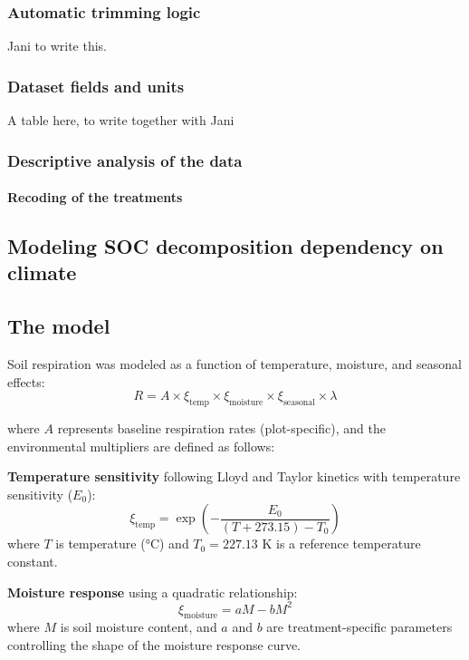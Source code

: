 \documentclass[12pt,a4paper]{article}
\begin{document}
\subsubsection{Automatic trimming logic}
Jani to write this.

\subsubsection{Dataset fields and units}
A table here, to write together with Jani




\subsubsection{Descriptive analysis of the data}



\paragraph{Recoding of the treatments}


\subsection{Modeling SOC decomposition dependency on climate}


\subsection{The model}
Soil respiration was modeled as a function of temperature, moisture, and seasonal effects:
\begin{equation}
R = A \times \xi_{\text{temp}} \times \xi_{\text{moisture}} \times \xi_{\text{seasonal}} \times \lambda
\end{equation}

where $A$ represents baseline respiration rates (plot-specific), and the environmental multipliers are defined as follows:

\textbf{Temperature sensitivity} following Lloyd and Taylor kinetics with temperature sensitivity ($E_0$):
\begin{equation}
\xi_{\text{temp}} = \exp\left(-\frac{E_0}{(T + 273.15) - T_0}\right)
\end{equation}
where $T$ is temperature (°C) and $T_0 = 227.13$ K is a reference temperature constant.

\textbf{Moisture response} using a quadratic relationship:
\begin{equation}
\xi_{\text{moisture}} = aM - bM^2
\end{equation}
where $M$ is soil moisture content, and $a$ and $b$ are treatment-specific parameters controlling the shape of the moisture response curve.
\end{document}
